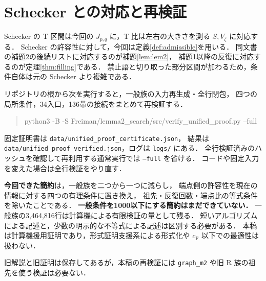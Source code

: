 \documentclass[10pt,a4paper]{article}
\theoremstyle{definition}
\newcommand{\CF}{c_{\mathrm F}}
\newcommand{\file}[1]{{\small\nolinkurl{#1}}}
\begin{document}
\section{Schecker との対応と再検証}
Schecker の T 区間は今回の $J_{p,q}$ に，T 比は左右の大きさを測る $S,V_\zeta$ に対応する．
Schecker の許容性に対して，今回は定義\ref{def:admissible}を用いる．
同文書の補題2の後続リストに対応するのが補題\ref{lem:lem2}，
補題1以降の反復に対応するのが定理\ref{thm:filling}である．
禁止語と切り取った部分区間が加わるため，条件自体は元の Schecker より複雑である．

リポジトリの根から次を実行すると，一般族の入力再生成・全行閉包，
四つの局所条件，34入口，136帯の接続をまとめて再検証する．
\begin{quote}\small\ttfamily
python3 -B -S Freiman/lemma2\_search/src/verify\_unified\_proof.py --full
\end{quote}
固定証明書は \file{data/unified_proof_certificate.json}，
結果は \file{data/unified_proof_verified.json}，ログは \file{logs/} にある．
全行検証済みのハッシュを確認して再利用する通常実行では \texttt{--full} を省ける．
コードや固定入力を変えた場合は全行検証をやり直す．

\textbf{今回できた簡約}は，一般族を二つから一つに減らし，
端点側の許容性を現在の情報に対する四つの有理条件に置き換え，
祖先・反復回数・端点比の等式条件を除いたことである．
\textbf{一般条件を1000以下にする簡約はまだできていない．}
一般族の3,464,816行は計算機による有限検証の量として残る．
短いアルゴリズムによる記述と，少数の明示的な不等式による記述は区別する必要がある．
本稿は計算機援用証明であり，形式証明支援系による形式化や $\CF$ 以下での最適性は扱わない．

旧解説と旧証明は保存してあるが，本稿の再検証には
\file{graph_m2} や旧 R 族の祖先を使う検証は必要ない．
\end{document}
